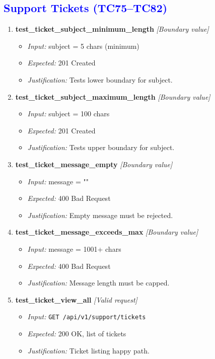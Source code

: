 \documentclass{article}
\begin{document}
\subsection*{\textcolor{blue}{Support Tickets (TC75--TC82)}}
\begin{enumerate}[resume, label=\textbf{TC\arabic*.}]

\item \textbf{test\_ticket\_subject\_minimum\_length} \textit{[Boundary value]}
\begin{itemize}[noitemsep]
  \item \textit{Input:} subject = 5 chars (minimum)
  \item \textit{Expected:} 201 Created
  \item \textit{Justification:} Tests lower boundary for subject.
\end{itemize}

\item \textbf{test\_ticket\_subject\_maximum\_length} \textit{[Boundary value]}
\begin{itemize}[noitemsep]
  \item \textit{Input:} subject = 100 chars
  \item \textit{Expected:} 201 Created
  \item \textit{Justification:} Tests upper boundary for subject.
\end{itemize}

\item \textbf{test\_ticket\_message\_empty} \textit{[Boundary value]}
\begin{itemize}[noitemsep]
  \item \textit{Input:} message = ""
  \item \textit{Expected:} 400 Bad Request
  \item \textit{Justification:} Empty message must be rejected.
\end{itemize}

\item \textbf{test\_ticket\_message\_exceeds\_max} \textit{[Boundary value]}
\begin{itemize}[noitemsep]
  \item \textit{Input:} message = 1001+ chars
  \item \textit{Expected:} 400 Bad Request
  \item \textit{Justification:} Message length must be capped.
\end{itemize}

\item \textbf{test\_ticket\_view\_all} \textit{[Valid request]}
\begin{itemize}[noitemsep]
  \item \textit{Input:} \texttt{GET /api/v1/support/tickets}
  \item \textit{Expected:} 200 OK, list of tickets
  \item \textit{Justification:} Ticket listing happy path.
\end{itemize}


\end{enumerate}
\end{document}
